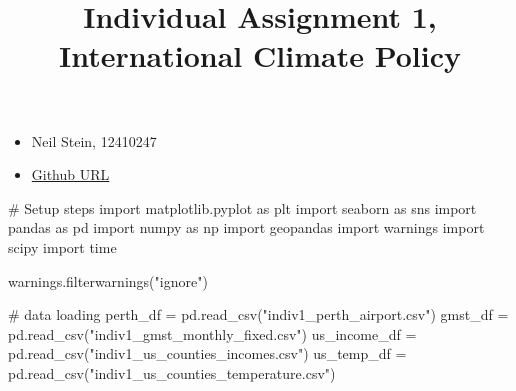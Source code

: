 \documentclass[
  letterpaper,
  DIV=11,
  numbers=noendperiod]{scrartcl}
\title{Individual Assignment 1, International Climate Policy}
\author{}
\date{}
\newenvironment{Shaded}{\begin{snugshade}}{\end{snugshade}}
\newcommand{\CommentTok}[1]{\textcolor[rgb]{0.37,0.37,0.37}{#1}}
\newcommand{\ImportTok}[1]{\textcolor[rgb]{0.00,0.46,0.62}{#1}}
\newcommand{\NormalTok}[1]{\textcolor[rgb]{0.00,0.23,0.31}{#1}}
\newcommand{\OperatorTok}[1]{\textcolor[rgb]{0.37,0.37,0.37}{#1}}
\newcommand{\StringTok}[1]{\textcolor[rgb]{0.13,0.47,0.30}{#1}}
\begin{document}
\maketitle


\begin{itemize}
\item
  Neil Stein, 12410247
\item
  \href{https://github.com/neil-stein/Assignment-1_ICP.git}{Github URL}
\end{itemize}

\begin{Shaded}
\begin{Highlighting}[]
\CommentTok{\# Setup steps}
\ImportTok{import}\NormalTok{ matplotlib.pyplot }\ImportTok{as}\NormalTok{ plt}
\ImportTok{import}\NormalTok{ seaborn }\ImportTok{as}\NormalTok{ sns}
\ImportTok{import}\NormalTok{ pandas }\ImportTok{as}\NormalTok{ pd}
\ImportTok{import}\NormalTok{ numpy }\ImportTok{as}\NormalTok{ np}
\ImportTok{import}\NormalTok{ geopandas}
\ImportTok{import}\NormalTok{ warnings}
\ImportTok{import}\NormalTok{ scipy}
\ImportTok{import}\NormalTok{ time}

\NormalTok{warnings.filterwarnings(}\StringTok{"ignore"}\NormalTok{)}

\CommentTok{\# data loading}
\NormalTok{perth\_df }\OperatorTok{=}\NormalTok{ pd.read\_csv(}\StringTok{"indiv1\_perth\_airport.csv"}\NormalTok{)}
\NormalTok{gmst\_df }\OperatorTok{=}\NormalTok{ pd.read\_csv(}\StringTok{"indiv1\_gmst\_monthly\_fixed.csv"}\NormalTok{)}
\NormalTok{us\_income\_df }\OperatorTok{=}\NormalTok{ pd.read\_csv(}\StringTok{"indiv1\_us\_counties\_incomes.csv"}\NormalTok{)}
\NormalTok{us\_temp\_df }\OperatorTok{=}\NormalTok{ pd.read\_csv(}\StringTok{"indiv1\_us\_counties\_temperature.csv"}\NormalTok{)}
\end{Highlighting}
\end{Shaded}
\end{document}
